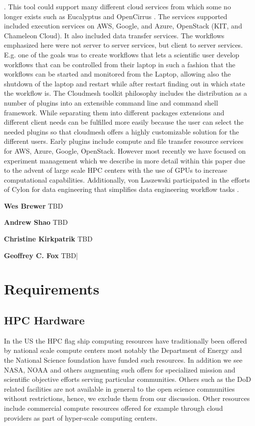 \documentclass[utf8]{FrontiersinVancouver} %
\begin{document}
\citep{las-04-ftp-journal}
\citep{las-03-ftp}.
This tool could support many different cloud services from which some no longer exists such as Eucalyptus \cite{eucalyptus} and OpenCirrus \cite{opencirrus}. The services supported included execution services on AWS, Google, and Azure, OpenStack (KIT, and Chameleon Cloud). It also included data transfer services. The workflows emphasized here were not server to server services, but client to server services. E.g. one of the goals was to create workflows that lets a scientific user develop workflows that can be controlled from their laptop in such a fashion that the workflows can be started and monitored from the Laptop, allowing also the shutdown of the laptop and restart while after restart finding out in which state the workflow is. 
The Cloudmesh toolkit philosophy includes the distribution as a number of plugins into an extensible command line and command shell framework. While separating them into different packages extensions and different client needs can be fulfilled more easily because the user can select the needed plugins so that cloudmesh offers a highly customizable solution for the different users. Early plugins include compute and file transfer resource services for AWS, Azure, Google, OpenStack. However  most recently we have focused on experiment management which we describe in more detail within this paper due to the advent of large scale HPC centers with the use of GPUs to increase computational capabilities. 
Additionally, von Laszewski participated in the efforts of Cylon for data engineering that simplifies data engineering workflow tasks \citep{cylon,cylon-radical}. 

{\bf Wes Brewer} TBD

{\bf Andrew Shao} TBD

{\bf Christine Kirkpatrik} TBD

{\bf Geoffrey C. Fox} TBD|


\section{Requirements}

\subsection{HPC Hardware}

In the US the HPC flag ship computing resources have traditionally been offered by national scale compute centers most notably the Department of Energy and the National Science foundation have funded such resources. In addition we see NASA, NOAA and others augmenting such offers for specialized mission and scientific objective efforts serving particular communities. Others such as the DoD related facilities are not available in general to the open science communities without restrictions, hence, we exclude them from our discussion. Other resources include commercial compute resources offered for example through cloud
providers as part of hyper-scale computing centers.
\end{document}
